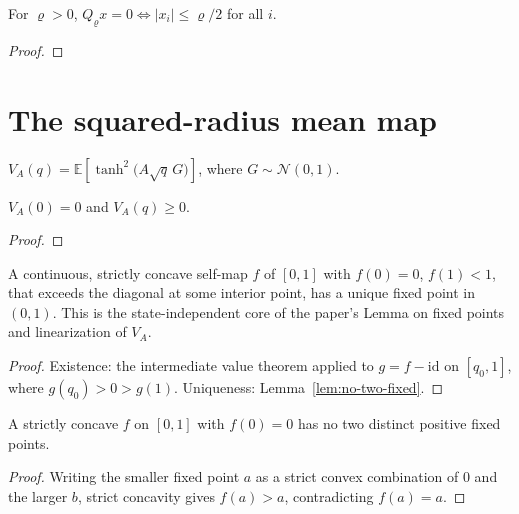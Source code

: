 \begin{lemma}
  \label{lem:Qrho-zero}
  \leanok
  For $\varrho>0$, $Q_\varrho x = 0 \iff |x_i|\le \varrho/2$ for all $i$.
\end{lemma}
\begin{proof}\leanok{}\end{proof}

\section{The squared-radius mean map}

\begin{definition}
  \label{def:V}
  \leanok
  $V_A(q) = \mathbb{E}\!\left[\tanh^2\!\big(A\sqrt{q}\,G\big)\right]$, where
  $G\sim\mathcal N(0,1)$.
\end{definition}

\begin{lemma}
  \label{lem:V-basic}
  \leanok
  $V_A(0) = 0$ and $V_A(q) \ge 0$.
\end{lemma}
\begin{proof}\leanok{}\end{proof}

\begin{theorem}
  \label{thm:fixed-point}
  \leanok
  A continuous, strictly concave self-map $f$ of $[0,1]$ with $f(0)=0$,
  $f(1)<1$, that exceeds the diagonal at some interior point, has a unique fixed
  point in $(0,1)$. This is the state-independent core of the paper's
  Lemma on fixed points and linearization of $V_A$.
\end{theorem}
\begin{proof}
  \leanok
  Existence: the intermediate value theorem applied to $g=f-\mathrm{id}$ on
  $[q_0,1]$, where $g(q_0)>0>g(1)$. Uniqueness: Lemma~\ref{lem:no-two-fixed}.
\end{proof}

\begin{lemma}
  \label{lem:no-two-fixed}
  \leanok
  A strictly concave $f$ on $[0,1]$ with $f(0)=0$ has no two distinct positive
  fixed points.
\end{lemma}
\begin{proof}
  \leanok
  Writing the smaller fixed point $a$ as a strict convex combination of $0$ and
  the larger $b$, strict concavity gives $f(a) > a$, contradicting $f(a)=a$.
\end{proof}


